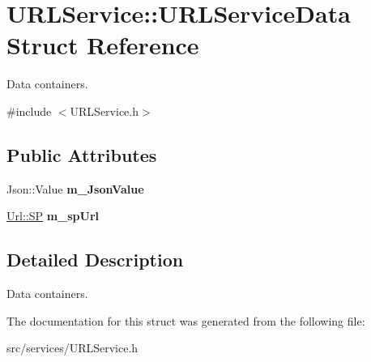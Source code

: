 \hypertarget{struct_u_r_l_service_1_1_u_r_l_service_data}{}\section{U\+R\+L\+Service\+:\+:U\+R\+L\+Service\+Data Struct Reference}
\label{struct_u_r_l_service_1_1_u_r_l_service_data}


Data containers.  




{\ttfamily \#include $<$U\+R\+L\+Service.\+h$>$}

\subsection*{Public Attributes}
\begin{DoxyCompactItemize}
\item 
\mbox{\label{struct_u_r_l_service_1_1_u_r_l_service_data_a4684af18502039c71eb8866d36c50b79}} 
Json\+::\+Value {\bfseries m\+\_\+\+Json\+Value}
\item 
\mbox{\label{struct_u_r_l_service_1_1_u_r_l_service_data_a0f8510d56d0990b4301537c384bdfc70}} 
\hyperlink{class_url_aaca644501980743f3446d0d7a31565be}{Url\+::\+SP} {\bfseries m\+\_\+sp\+Url}
\end{DoxyCompactItemize}


\subsection{Detailed Description}
Data containers. 

The documentation for this struct was generated from the following file\+:\begin{DoxyCompactItemize}
\item 
src/services/U\+R\+L\+Service.\+h\end{DoxyCompactItemize}
